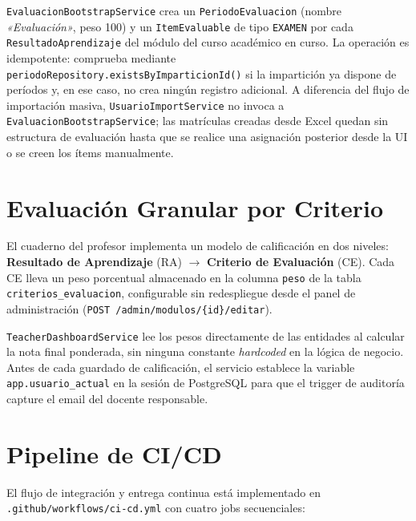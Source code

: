 \documentclass[12pt, a4paper]{report}
\begin{document}
\texttt{EvaluacionBootstrapService} crea un \texttt{PeriodoEvaluacion} (nombre
\textit{«Evaluación»}, peso 100) y un \texttt{ItemEvaluable} de tipo \texttt{EXAMEN}
por cada \texttt{ResultadoAprendizaje} del módulo del curso académico en curso.
La operación es idempotente: comprueba mediante
\texttt{periodoRepository.existsByImparticionId()} si la impartición ya dispone de
períodos y, en ese caso, no crea ningún registro adicional. A diferencia del flujo de
importación masiva, \texttt{UsuarioImportService} no invoca a
\texttt{EvaluacionBootstrapService}; las matrículas creadas desde Excel quedan sin
estructura de evaluación hasta que se realice una asignación posterior desde la UI o
se creen los ítems manualmente.

\section{Evaluación Granular por Criterio}

El cuaderno del profesor implementa un modelo de calificación en dos niveles:
\textbf{Resultado de Aprendizaje} (RA) $\rightarrow$ \textbf{Criterio de
Evaluación} (CE). Cada CE lleva un peso porcentual almacenado en la columna
\texttt{peso} de la tabla \texttt{criterios\_evaluacion}, configurable sin
redespliegue desde el panel de administración
(\texttt{POST /admin/modulos/\{id\}/editar}).

\texttt{TeacherDashboardService} lee los pesos directamente de las entidades al
calcular la nota final ponderada, sin ninguna constante \textit{hardcoded} en la
lógica de negocio. Antes de cada guardado de calificación, el servicio establece
la variable \texttt{app.usuario\_actual} en la sesión de PostgreSQL para que el
trigger de auditoría capture el email del docente responsable.

\section{Pipeline de CI/CD}

El flujo de integración y entrega continua está implementado en
\texttt{.github/workflows/ci-cd.yml} con cuatro jobs secuenciales:
\end{document}
